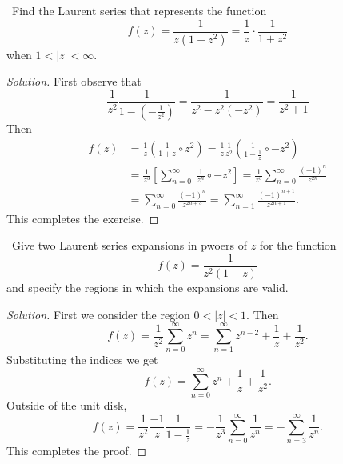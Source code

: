\documentclass[11pt]{amsart}
\theoremstyle{definition}
\numberwithin{theorem}{section}
\numberwithin{definition}{section}
\numberwithin{equation}{section}
\newenvironment{solution}
  {\begin{proof}[Solution]}
  {\end{proof}}
\begin{document}
\medskip {}\ Find the Laurent series that represents the function
\begin{equation*}
	f(z) = \frac{1}{z(1+z^2)} = \frac{1}{z} \cdot \frac{1}{1 + z^2}
\end{equation*}
when $1 < |z| < \infty.$
\begin{solution}
	First observe that 
	\begin{equation*}
		\frac{1}{z^2}\frac{1}{1 - (-\frac{1}{z^2})} = \frac{1}{z^2 - z^2(-z^2)} = \frac{1}{z^2+ 1}
	\end{equation*}
	Then 
	\begin{equation*}
	\begin{aligned}
		f(z) &= \frac{1}{z} \left(\frac{1}{1 + z}\circ z^2\right) 
		= \frac{1}{z} \frac{1}{z^2}\left(\frac{1}{1 -\frac{1}{z}} \circ -z^2\right) \\
		&= \frac{1}{z^3} \left[\sum_{n=0}^\infty\ \frac{1}{z^n} \circ -z^2 \right] = \frac{1}{z^3} \sum_{n=0}^\infty \frac{(-1)^n}{z^{2n}} \\
		&= \sum_{n=0}^\infty \frac{(-1)^n}{z^{2n + 3}} = \sum_{n=1}^\infty \frac{(-1)^{n+1}}{z^{2n+1}}.
	\end{aligned}
	\end{equation*}
	This completes the exercise.
\end{solution}


\medskip {}\  Give two Laurent series expansions in pwoers of $z$ for the function
\begin{equation*}
	f(z)  = \frac{1}{z^2(1-z)}
\end{equation*} and specify the regions in which the expansions are valid.
\begin{solution}
	First we consider the region $0 < |z| < 1$. Then
	\begin{equation*}
		f(z) = \frac{1}{z^2} \sum_{n=0}^\infty z^n =  \sum_{n=1}^\infty z^{n-2} + \frac{1}{z} + \frac{1}{z^2}.
	\end{equation*}
	Substituting the indices we get
	\begin{equation*}
		f(z) = \sum_{n=0}^\infty z^{n} + \frac{1}{z} + \frac{1}{z^2}.
	\end{equation*}
	Outside of the unit disk,
	\begin{equation*}
		f(z) = \frac{1}{z^2} \frac{-1}{z}\frac{1}{1 - \frac{1}{z}} = -\frac{1}{z^3} \sum_{n=0}^\infty \frac{1}{z^n} = -\sum_{n=3}^\infty \frac{1}{z^n}.
	\end{equation*}
	This completes the proof.
\end{solution}
\end{document}
